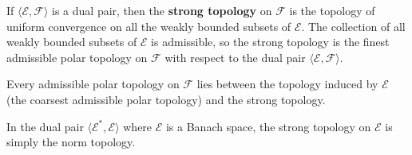 If $\langle \mathcal{E}, \mathcal{F} \rangle$ is a dual pair, then the \textbf{strong topology} on $\mathcal{F}$ is the topology of uniform convergence on all the weakly bounded subsets of $\mathcal{E}$. The collection of all weakly bounded subsets of $\mathcal{E}$ is admissible, so the strong topology is the finest admissible polar topology on $\mathcal{F}$ with respect to the dual pair $\langle \mathcal{E}, \mathcal{F} \rangle$.

Every admissible polar topology on $\mathcal{F}$ lies between the topology induced by $\mathcal{E}$ (the coarsest admissible polar topology) and the strong topology.

In the dual pair $\langle \mathcal{E}^*, \mathcal{E} \rangle$ where $\mathcal{E}$ is a Banach space, the strong topology on $\mathcal{E}$ is simply the norm topology.
